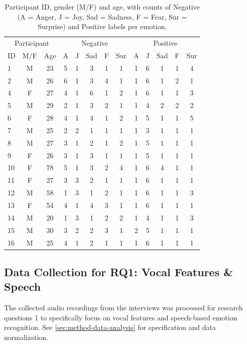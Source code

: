 \begin{table}[H]
  \centering
  \begin{tabular}{@{} 
      l  c  c   
      *{5}{c}   
      *{5}{c}   
    @{}}
    \toprule
    \multicolumn{3}{c}{Participant} 
      & \multicolumn{5}{c}{Negative} 
      & \multicolumn{5}{c}{Positive} \\
    \cmidrule(lr){1-3} \cmidrule(lr){4-8} \cmidrule(lr){9-13}
    ID & M/F & Age 
      & A & J & Sad & F & Sur 
      & A & J & Sad & F & Sur \\
    \midrule
    1  & M & 23 & 5 & 1 & 3 & 1 & 1 & 1 & 6 & 1 & 1 & 4 \\
    2  & M & 26 & 6 & 1 & 3 & 4 & 1 & 1 & 6 & 1 & 2 & 1 \\
    4  & F & 27 & 4 & 1 & 6 & 1 & 2 & 1 & 6 & 1 & 1 & 3 \\
    5  & M & 29 & 2 & 1 & 3 & 2 & 1 & 1 & 4 & 2 & 2 & 2 \\
    6  & F & 28 & 4 & 1 & 4 & 1 & 2 & 1 & 5 & 1 & 1 & 5 \\
    7  & M & 25 & 2 & 2 & 1 & 1 & 1 & 1 & 3 & 1 & 1 & 1 \\
    8  & M & 27 & 3 & 1 & 2 & 1 & 2 & 1 & 5 & 1 & 1 & 1 \\
    9  & F & 26 & 3 & 1 & 3 & 1 & 1 & 1 & 5 & 1 & 1 & 1 \\
    10 & F & 78 & 5 & 1 & 3 & 2 & 4 & 1 & 6 & 4 & 1 & 1 \\
    11 & F & 27 & 3 & 3 & 2 & 1 & 1 & 1 & 6 & 1 & 1 & 1 \\
    12 & M & 58 & 1 & 3 & 1 & 2 & 1 & 1 & 6 & 1 & 1 & 3 \\
    13 & F & 54 & 4 & 1 & 4 & 3 & 1 & 1 & 6 & 1 & 1 & 1 \\
    14 & M & 20 & 1 & 3 & 1 & 2 & 2 & 1 & 4 & 1 & 1 & 3 \\
    15 & M & 30 & 3 & 2 & 2 & 3 & 1 & 2 & 5 & 1 & 1 & 1 \\
    16 & M & 25 & 4 & 1 & 2 & 1 & 1 & 1 & 6 & 1 & 1 & 1 \\
    \bottomrule
  \end{tabular}
  \caption{Participant ID, gender (M/F) and age, with counts of Negative (A = Anger, J = Joy, Sad = Sadness, F = Fear, Sur = Surprise) and Positive labels per emotion.}
  \label{tab:interview_table}
\end{table}

\subsection{Data Collection for RQ1: Vocal Features \& Speech}
The collected audio recordings from the interviews was processed for research questions 1 to specifically focus on vocal features and speech-based emotion recognition. 
See \ref{sec:method-data-analysis} for specification and data normalization. 

